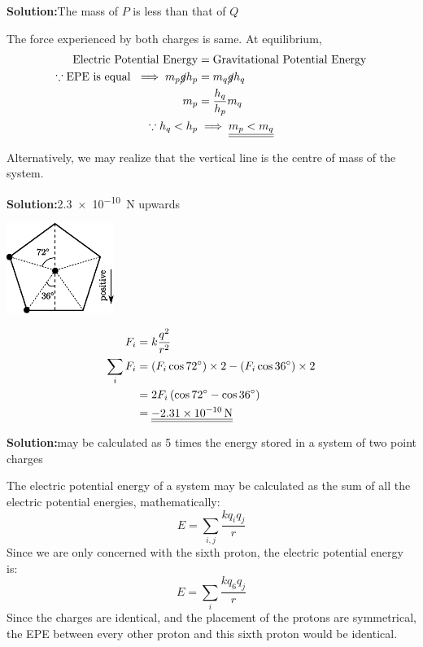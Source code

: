 \documentclass[11pt]{article}
\newcommand*\circled[1]{\tikz[baseline=(char.base)]{
		\node[shape=circle,draw,inner sep=2pt] (char) {#1};}}
\def\doubleunderline#1{\underline{\underline{#1}}}
\newcommand{\solution}[2]{\textbf{Solution:\hspace{1em}\circled{#1}}\hspace{1em}#2\hspace{1em}}
\newlength{\currentparskip}
\begin{document}
\begin{enumerate}[label={[Q\arabic*]},itemsep={1em}]
		\item \solution{C}{The mass of $P$ is less than that of $Q$}
			
			The force experienced by both charges is same. At equilibrium,
			\begin{align*}
				\text{Electric Potential Energy} &= \text{Gravitational Potential Energy} \\
				\because \text{EPE is equal~} \implies m_p \cancel{g} h_p &= m_q \cancel{g} h_q \\
				m_p &= \frac{h_q}{h_p} m_q \\
				\because h_q < h_p &\implies \doubleunderline{m_p < m_q}
			\end{align*}
			
			Alternatively, we may realize that the vertical line is the centre of mass of the system. 
		
		\item \solution{A}{\SI{2.3e-10}{\newton} upwards}
		
			\begin{minipage}[c]{3.5cm}
				\includegraphics[width=3.5cm]{34.eps}
			\end{minipage}%
			\setlength{\currentparskip}{\parskip}		%
			\begin{minipage}{\textwidth - 5cm}
				\setlength{\parskip}{\currentparskip}	%
				\begin{align*}
					F_i &= k \frac{q^2}{r^2} \\
					\sum_i F_i &= \left(F_i\cos 72\degree\right) \times 2 - \left(F_i\cos 36\degree\right) \times 2 \\
					&= 2F_i \left(\cos 72 \degree - \cos 36\degree\right) \\
					&= \doubleunderline{\SI{-2.31e-10}{\newton}}
				\end{align*}
			\end{minipage}
		
		\item \solution{D}{may be calculated as 5 times the energy stored in a system of two point charges}
			
			The electric potential energy of a system may be calculated as the sum of all the electric potential energies, mathematically:
			\begin{equation*}
				E = \sum_{i, j} \frac{kq_iq_j}{r}
			\end{equation*}
			Since we are only concerned with the sixth proton, the electric potential energy is:
			\begin{equation*}
			E = \sum_{i} \frac{kq_6q_j}{r}
			\end{equation*}
			Since the charges are identical, and the placement of the protons are symmetrical, the EPE between every other proton and this sixth proton would be identical. 
			

\end{enumerate}
\end{document}
